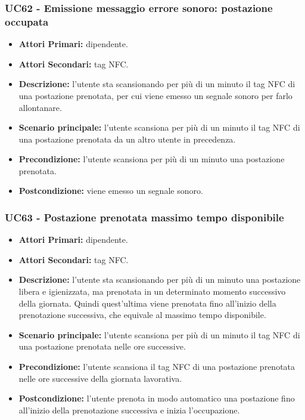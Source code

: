 \subsubsection{ UC62 - Emissione messaggio errore sonoro: postazione occupata}
\begin{itemize}
	\item\textbf{Attori Primari:} dipendente.
	\item\textbf{Attori Secondari:} tag NFC.
	\item\textbf{Descrizione:} l'utente sta scansionando per più di un minuto il tag NFC di una postazione prenotata, per cui viene emesso un segnale sonoro per farlo allontanare.
	\item\textbf{Scenario principale:} l’utente scansiona per più di un minuto il tag NFC di una postazione prenotata da un altro utente in precedenza.
	\item\textbf{Precondizione:} l'utente scansiona per più di un minuto una postazione prenotata.
	\item\textbf{Postcondizione:} viene emesso un segnale sonoro.
\end{itemize}

\subsubsection{ UC63 - Postazione prenotata massimo tempo disponibile}
\begin{itemize}
	\item\textbf{Attori Primari:} dipendente.
	\item\textbf{Attori Secondari:} tag NFC.
	\item\textbf{Descrizione:} l'utente sta scansionando per più di un minuto una postazione libera e igienizzata, ma prenotata in un determinato momento successivo della giornata. Quindi quest'ultima viene prenotata fino all'inizio della prenotazione successiva, che equivale al massimo tempo disponibile.
	\item\textbf{Scenario principale:} l'utente scansiona per più di un minuto il tag NFC di una postazione prenotata nelle ore successive.
	\item\textbf{Precondizione:} l'utente scansiona il tag NFC di una postazione prenotata nelle ore successive della giornata lavorativa.
	\item\textbf{Postcondizione:} l'utente prenota in modo automatico una postazione fino all'inizio della prenotazione successiva e inizia l'occupazione.
\end{itemize}


